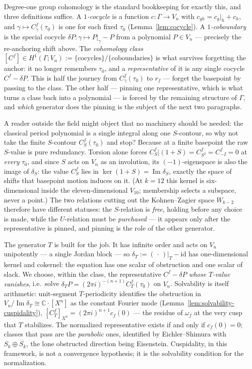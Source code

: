 \documentclass[11pt]{article}
\numberwithin{equation}{section}  %
\newcommand{\CC}{\mathbb{C}}
\DeclareMathOperator{\im}{Im}
\begin{document}
Degree-one group cohomology is the standard bookkeeping for exactly this,
and three definitions suffice.  A \emph{$1$-cocycle} is a function
$c\colon \Gamma \to V_n$ with $c_{gh} = c_g|_h + c_h$, and
$\gamma \mapsto C^f_\gamma(\tau_0)$ is one for each fixed $\tau_0$
(Lemma~\ref{lem:cocycle}).  A \emph{$1$-coboundary} is the special cocycle
$\delta P\colon \gamma \mapsto P|_\gamma - P$ from a polynomial
$P \in V_n$ --- precisely the re-anchoring shift above.  The
\emph{cohomology class}
$[C^f] \in H^1(\Gamma; V_n) := \{\text{cocycles}\}/\{\text{coboundaries}\}$
is what survives forgetting the anchor: it no longer remembers $\tau_0$,
and a \emph{representative} of it is any single cocycle $C^f - \delta P$.
This is half the journey from $C^f_\gamma(\tau_0)$ to $r_f$ --- forget the
basepoint by passing to the class.  The other half --- pinning one
representative, which is what turns a class back into a polynomial --- is
forced by the remaining structure of $\Gamma$, and \emph{which} generator
does the pinning is the subject of the next two paragraphs.

A reader outside the field might object that no machinery should be
needed: the classical period polynomial is a single integral along one
$S$-contour, so why not take the finite $S$-contour $C^f_S(\tau_0)$ and
stop?  Because at a finite basepoint the raw $S$-value is pure
redundancy.  Torsion alone forces
$C^f_S\big|(1+S) = C^f_{S^2} = C^f_{-I} = 0$ at \emph{every} $\tau_0$,
and since $S$ acts on $V_n$ as an involution, its $(-1)$-eigenspace is
also the image of $\delta_S$: the value $C^f_S$ lies in
$\ker(1+S) = \im \delta_S$, exactly the space of shifts that basepoint
motion induces on it.  (At $k = 12$ this kernel is six-dimensional
inside the eleven-dimensional $V_{10}$; membership selects a subspace,
never a point.)  The two relations cutting out the Kohnen--Zagier space
$W_{k-2}$ \cite{KZ1984} therefore have different statuses: the
$S$-relation is \emph{free}, holding before any choice is made, while
the $U$-relation must be \emph{purchased} --- it appears only after the
representative is pinned, and pinning is the role of the other
generator.

The generator $T$ is built for the job.  It has infinite order and acts
on $V_n$ unipotently --- a single Jordan block --- so
$\delta_T := (\,\cdot\,)|_T - \mathrm{id}$ has one-dimensional kernel
and cokernel: the equation has one scalar of obstruction and one scalar
of slack.  We choose, within the class, the representative
$C^f - \delta P$ \emph{whose $T$-value vanishes}, i.e.\ solve
$\delta_T P = (2\pi i)^{-(n+1)} C^f_T(\tau_0)$ on $V_n$.  Solvability is
itself arithmetic: unit-segment $T$-periodicity identifies the
obstruction in $V_n / \im \delta_T \cong \CC \cdot [X^n]$ as the
constant Fourier mode (Lemma~\ref{lem:solvability-cuspidality}),
$[C^f_T]_{X^n} = (2\pi i)^{n+1} c_f(0)$ --- the residue of $\omega_f$ at
the very cusp that $T$ stabilizes.  The normalized representative exists
if and only if $c_f(0) = 0$; classes that pass are the \emph{parabolic}
ones, identified by Eichler--Shimura \cite{KZ1984} with
$S_k \oplus \overline{S_k}$, the lone obstructed direction being
Eisenstein.  Cuspidality, in this framework, is not a convergence
hypothesis; it is the solvability condition for the normalization.
\end{document}
